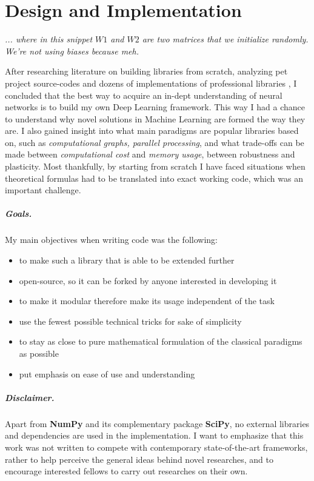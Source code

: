 \chapter{Design and Implementation}

\epigraph{\textit{... where in this snippet $W1$ and $W2$ are two matrices that we initialize randomly. We're not using biases because meh.}}{}

After researching literature on building libraries from scratch, analyzing pet project source-codes \cite{convnetjs, gibianskysource} and dozens of implementations of professional libraries \cite{TF, caffe, torch},
I concluded that the best way to acquire an in-dept understanding of neural networks is to build my own Deep Learning framework.
This way I had a chance to understand why novel solutions in Machine Learning are formed the way they are.
I also gained insight into what main paradigms are popular libraries based on, such as \emph{computational graphs, parallel processing}, 
and what trade-offs can be made between \emph{computational cost} and \emph{memory usage}, between robustness and plasticity.
Most thankfully, by starting from scratch I have faced situations when theoretical formulas had to be translated into exact working code, which was an important challenge.

\paragraph{Goals.} My main objectives when writing code was the following:
\begin{itemize}
    \item[] to make such a library that is able to be extended further
    \item[] open-source, so it can be forked by anyone interested in developing it
    \item[] to make it modular therefore make its usage independent of the task
    \item[] use the fewest possible technical tricks for sake of simplicity
    \item[] to stay as close to pure mathematical formulation of the classical paradigms as possible
    \item[] put emphasis on ease of use and understanding
\end{itemize}
\paragraph{Disclaimer.} Apart from \textbf{NumPy} and its complementary package \textbf{SciPy}, no external libraries and dependencies are used in the implementation. 
I want to emphasize that this work was not written to compete with contemporary state-of-the-art frameworks, rather to help perceive the general ideas behind novel researches, and to encourage interested fellows to carry out researches on their own.

